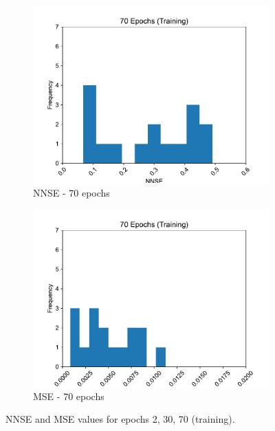 \documentclass[11pt,twocolumn]{article}
\begin{document}
\begin{figure}[p]
     \hfill
          \newline
     \hfill
     \begin{subfigure}[b]{0.49\textwidth}
        \centering\includegraphics[width=1.0\linewidth]{images/70_training-NNSE.pdf}
        \caption{NNSE - 70 epochs}
        \label{fig:tbd3}
     \end{subfigure}
     \hfill
     \begin{subfigure}[b]{0.49\textwidth}
        \centering\includegraphics[width=1.0\linewidth]{images/70_training-MSE.pdf}
        \caption{MSE - 70 epochs}
        \label{fig:tbd4}
     \end{subfigure}
        \caption{NNSE and MSE values for epochs 2, 30, 70 (training).}
        \label{fig:six graphs}
\end{figure}
\end{document}
